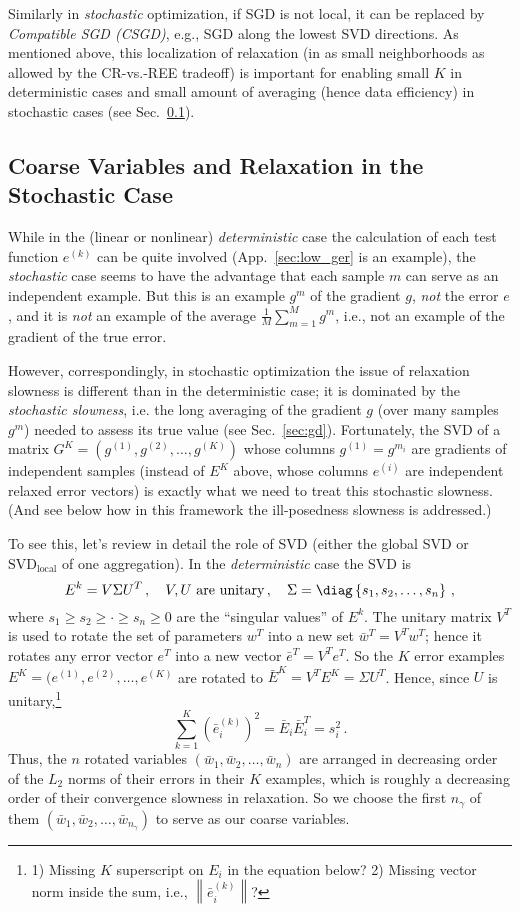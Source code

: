 \documentclass{article} %
\begin{document}
Similarly in {\it stochastic} optimization, if SGD is not local, it can be replaced by {\it Compatible SGD (CSGD)}, e.g., SGD along the lowest SVD directions. As mentioned above, this localization of relaxation (in as small neighborhoods as allowed by the CR-vs.-REE tradeoff) is important for enabling small $K$ in deterministic cases and small amount of averaging (hence data efficiency) in stochastic cases (see Sec.~\ref{sec:5.6}).

\subsection{Coarse Variables and Relaxation in the Stochastic Case}
\label{sec:5.6}
While in the (linear or nonlinear) {\it deterministic} case the calculation of each test function $e^{(k)}$ can be quite involved (App.~\ref{sec:low_ger} is an example), the {\it stochastic} case seems to have the advantage that each sample $m$ can serve as an independent example. But this is an example $g^m$ of the gradient $g$, {\it not} the error $e$, and it is {\it not} an example of the average $\frac{1}{M} \sum_{m=1}^M g^m$, i.e., not an example of the gradient of the true error.

However, correspondingly, in stochastic optimization the issue of relaxation slowness is different than in the deterministic case; it is dominated by the {\it stochastic slowness}, i.e. the long averaging of the gradient $g$ (over many samples $g^m$) needed to assess its true value (see Sec.~\ref{sec:gd}). Fortunately, the SVD of a matrix $G^K = (g^{(1)},g^{(2)},\dots,g^{(K)})$ whose columns $g^{(1)}=g^{m_i}$ are gradients of independent samples (instead of $E^K$ above, whose columns $e^{(i)}$ are independent relaxed error vectors) is exactly what we need to treat this stochastic slowness. (And see below how in this framework the ill-posedness slowness is addressed.)

To see this, let's review in detail the role of SVD (either the global SVD or $\text{SVD}_{\text{local}}$ of one aggregation). In the {\it deterministic} case the SVD is
$$ E^k = V \Sigma U^T\,,\quad V, U \text{ are unitary}\,,\quad \Sigma = \diag\left\{s_1, s_2, \dots, s_n \right\}\,,$$
where $s_1 \geq s_2 \geq \cdot \geq s_n \geq 0$ are the ``singular values'' of $E^k$. The unitary matrix $V^T$ is used to rotate the set of parameters $w^T$ into a new set $\bar{w}^T = V^T w^T$; hence it rotates any error vector $e^T$ into a new vector $\bar{e}^T = V^T e^T$. So the $K$ error examples $E^K = (e^{(1)},e^{(2)},\dots,e^{(K)}$ are rotated to $\bar{E}^K = V^T E^K = \Sigma U^T$. Hence, since $U$ is unitary,\footnote{1) Missing $K$ superscript on $E_i$ in the equation below? 2) Missing vector norm inside the sum, i.e., $\left\|\bar{e}_i^{(k)}\right\|$?}
$$ \sum_{k=1}^K \left(\bar{e}_i^{(k)}\right)^2 = \bar{E}_i \bar{E}_i^T = s_i^2\,.$$
Thus, the $n$ rotated variables $(\bar{w}_1,\bar{w}_2,\dots,\bar{w}_n)$ are arranged in decreasing order of the $L_2$ norms of their errors in their $K$ examples, which is roughly a decreasing order of their convergence slowness in relaxation. So we choose the first $n_{\gamma}$ of them $(\bar{w}_1,\bar{w}_2,\dots,\bar{w}_{n_{\gamma}})$ to serve as our coarse variables.
\end{document}
